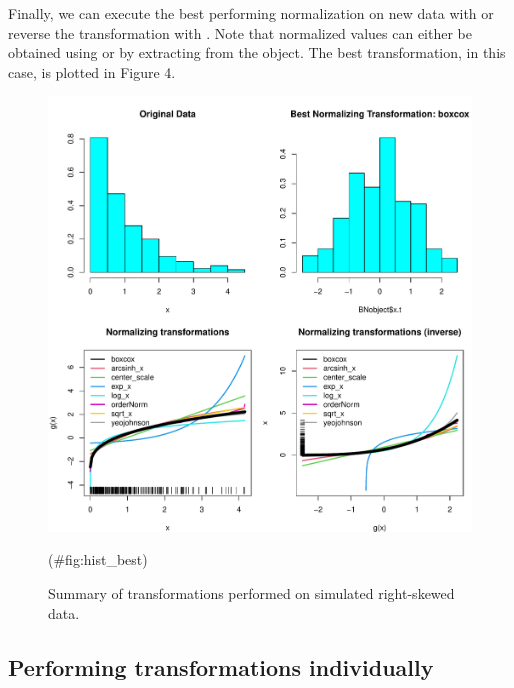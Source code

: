 Finally, we can execute the best performing normalization on new data
with  or reverse the
transformation with
.
Note that normalized values can either be obtained using 
or by extracting  from the object. The best transformation, in
this case, is plotted in Figure 4.

\begin{Schunk}
\begin{figure}

{\centering \includegraphics[width=1\linewidth]{figs/hist_best-1} 

}

\caption[Summary of transformations performed on simulated right-skewed data]{Summary of transformations performed on simulated right-skewed data.}(\#fig:hist_best)
\end{figure}
\end{Schunk}

\hypertarget{performing-transformations-individually}{%
\subsection{Performing transformations
individually}\label{performing-transformations-individually}}

